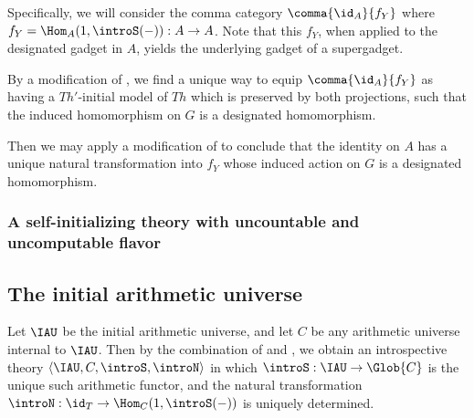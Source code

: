 \begin{construction}
Specifically, we will consider the comma category $\comma{\id_A}{f_Y}$ where $f_Y = \Hom_A(1, \introS(-)) : A \to A$. Note that this $f_Y$, when applied to the designated gadget in $A$, yields the underlying gadget of a supergadget.

By a modification of , we find a unique way to equip $\comma{\id_A}{f_Y}$ as having a $Th'$-initial model of $Th$ which is preserved by both projections, such that the induced homomorphism on $G$ is a designated homomorphism.

Then we may apply a modification of  to conclude that the identity on $A$ has a unique natural transformation into $f_Y$ whose induced action on $G$ is a designated homomorphism.

\end{construction}

\subsubsection{A self-initializing theory with uncountable and uncomputable flavor}



\subsection{The initial arithmetic universe}
\begin{construction}\label{IAUAsIntrospGeneral}
Let $\IAU$ be the initial arithmetic universe, and let $C$ be any arithmetic universe internal to $\IAU$. Then by the combination of  and , we obtain an introspective theory $\langle \IAU, C, \introS, \introN \rangle$ in which $\introS : \IAU \to \Glob{C}$ is the unique such arithmetic functor, and the natural transformation $\introN : \id_T \to \Hom_C(1, \introS(-))$ is uniquely determined.
\end{construction}

